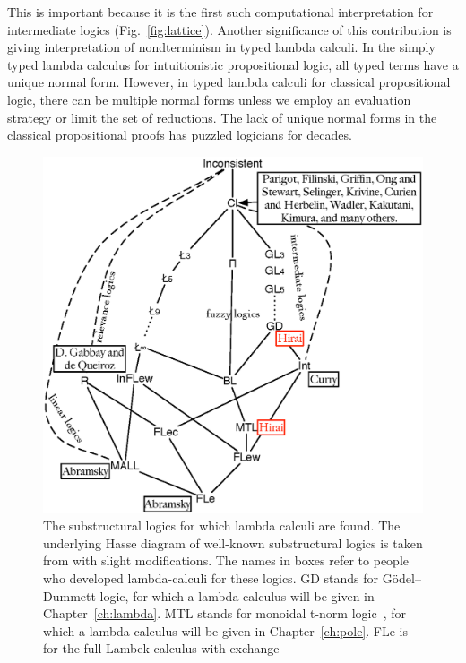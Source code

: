 This is important because it is the first such computational
interpretation for intermediate logics (Fig.~\ref{fig:lattice}).
Another significance of this contribution
is giving interpretation of nondterminism in typed
lambda calculi.  In the simply typed lambda calculus for intuitionistic
propositional logic, all typed terms have a unique normal form.
However, in typed lambda calculi for classical propositional logic,
there can be multiple normal forms unless we employ an evaluation
strategy or limit the set of reductions.
The lack of unique normal forms in the classical propositional proofs
has puzzled logicians for decades. 
 \begin{figure}
  \centering
  \includegraphics[scale=0.9]{lattice.eps}
  \caption[The substructural logics with lambda calculi.]
  {The substructural logics for which lambda calculi are found.
  The underlying Hasse diagram of well-known substructural logics is
  taken from
  \cite[p.~120]{residuated} with slight modifications.
  The names in boxes refer to people who developed lambda-calculi for
  these logics.
  \textsf{GD} stands for G\"odel--Dummett logic, for which
  a lambda calculus will be given in
  Chapter~\ref{ch:lambda}.
  \textsf{MTL} stands for monoidal t-norm logic~\citep{Esteva2001271},
  for which a lambda calculus will be given
  in Chapter~\ref{ch:pole}.
  \textsf{FLe} is for the full Lambek calculus with exchange
}
\end{figure}
